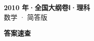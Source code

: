 \documentclass[zihao=-4, a4paper]{ctexart}
\begin{document}
\begin{center}
  {\Large\bfseries 2010 年·全国大纲卷Ⅰ·理科}\\[4pt]
  {\large 数学 · 简答版}
\end{center}
\medskip
{}

\clearpage
{}
\begin{center}{\Large\bfseries 答案速查}\end{center}
\medskip

\end{document}
